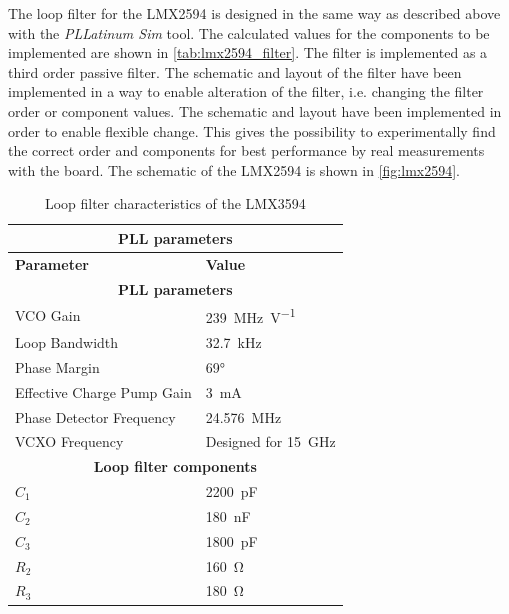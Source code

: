 The loop filter for the LMX2594 is designed in the same way as described above with the \textit{PLLatinum Sim} tool. 
The calculated values for the components to be implemented are shown in \autoref{tab:lmx2594_filter}.
The filter is implemented as a third order passive filter.
The schematic and layout of the filter have been implemented in a way to enable alteration of the filter, i.e. changing the filter order or component values.
The schematic and layout have been implemented in order to enable flexible change.
This gives the possibility to experimentally find the correct order and components for best performance by real measurements with the board.
The schematic of the LMX2594 is shown in \autoref{fig:lmx2594}.
\begin{table}[tb]
	\caption[LMX2594 loop filter characteristics]{Loop filter characteristics of the LMX3594}
	\label{tab:lmx2594_filter}
	\centering
	\begin{tabularx}{\textwidth}{Xl}
		 \multicolumn{2}{c}{\textbf{PLL parameters}}                             \\
		\toprule
		\textbf{Parameter}                         & \textbf{Value}             \\ 
		\midrule
		\multicolumn{2}{c}{\textbf{PLL parameters}}                             \\
		VCO Gain                                   & \SI{239}{\MHz\per\volt}    \\
		Loop Bandwidth                             & \SI{32.7}{\kHz}            \\
		Phase Margin                               & \ang{69}                   \\
		Effective Charge Pump Gain                 & \SI{3}{\milli\ampere}      \\
		Phase Detector Frequency                   & \SI{24.576}{\MHz}          \\
		VCXO Frequency                             & Designed for \SI{15}{\GHz} \\
		[0.3cm]
		\multicolumn{2}{c}{\textbf{Loop filter components}}   \\                        
		$C_{1}$                          & \SI{2200}{\pico\farad}     \\
		$C_{2}$                          & \SI{180}{\nano\farad}      \\
		$C_{3}$                          & \SI{1800}{\pico\farad}     \\
		$R_{2}$                                    & \SI{160}{\ohm}             \\
		$R_{3}$                          & \SI{180}{\ohm}             \\ \bottomrule
	\end{tabularx}
\end{table}

